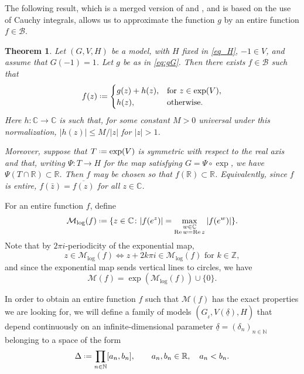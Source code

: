 \documentclass[a4paper, 11pt, reqno]{amsart}
\numberwithin{equation}{section}
\theoremstyle{plain}
\newtheorem{theorem}{Theorem}[section]
\newcommand*{\defeq}{\mathrel{\vcenter{\baselineskip0.5ex \lineskiplimit0pt
 \hbox{\scriptsize.}\hbox{\scriptsize.}}}=}
\theoremstyle{remark}
\newcommand{\C}{{\mathbb{C}}}
\newcommand{\R}{{\mathbb{R}}}
\newcommand{\Z}{{\mathbb{Z}}}
\newcommand{\N}{{\mathbb{N}}}
\newcommand{\M}{{\mathcal{M}}}
\newcommand{\Mlog}{{\mathcal{M}_{\log}}}
\newcommand{\B}{{\mathcal{B}}}
\newcommand{\uldelta}{\underline{\delta}}
\newcommand{\Rea}{\operatorname{Re }}
\begin{document}
The following result, which is a merged version of \cite[Theorem 1.7]{lasse_model14} and \cite[Corollary 4.5]{lasse_model14}, and is based on the use of Cauchy integrals, allows us to approximate the function $g$ by an entire function $f \in \B$.
\begin{theorem}
	\label{thm_approx1.7}
	Let $(G, V, H)$ be a model, with $H$ fixed in \eqref{eq_H}, $-1\in V$, and assume that $G(-1)=1$.
	Let $g$ be as in \eqref{eq:gG}.
	Then there exists $f\in \mathcal{B}$ such that
	\begin{equation}
		\label{eq_f}
		f(z) \defeq 
		\begin{cases}
			g(z)+h(z), &\text{for } z\in \exp(V), \\
			h(z),   &\text{otherwise.}
		\end{cases}
	\end{equation}
	Here $h\colon \C \rightarrow \C$ is such that, for some constant $M>0$ universal under this normalization, $\vert h(z)\vert \leq M/\vert z \vert $ for $|z| > 1$.

Moreover, suppose that \(T\defeq \exp(V)\) is symmetric with respect to the real axis and that, writing \(\Psi\colon T\to H\) for the map satisfying
	\(G=\Psi\circ\exp\), we have \(\Psi(T\cap\R)\subset\R\). Then \(f\) may be
	chosen so that \(f(\R)\subset\R\). Equivalently, since \(f\) is entire,
	\(f(\bar z)=\overline{f(z)}\) for all \(z\in\C\).
\end{theorem}
%
For an entire function $f$, define
\[
\Mlog(f) \defeq \{ z \in \C \colon |f(e^z)| = \max_{\substack{ w \in \C \\ \Rea w = \Rea z}} |f(e^w)| \}.
\] 
Note that by $2\pi i$-periodicity of the exponential map, 
\begin{equation}\label{eq_max_translates}
	z\in \Mlog(f) \iff z + 2 k\pi i \in \Mlog(f) \text{ for } k\in \Z,
\end{equation}
and since the exponential map sends vertical lines to circles, we have $$\M(f)=\exp(\Mlog(f))\cup\{0\}.$$

In order to obtain an entire function $f$ such that $\M(f)$ has the exact properties we are looking for, we will define a family of models $(G_{_{\uldelta}}, V(\uldelta), H)$ that depend continuously on an infinite-dimensional parameter $\uldelta=(\delta_n)_{n\in\N}$ belonging to a space of the form 
\begin{equation} \label{eq_Delta}
	\Delta\defeq \prod_{n\in\N} [a_n,b_n], \qquad a_n,b_n \in \R,\quad a_n<b_n.
\end{equation}
\end{document}
